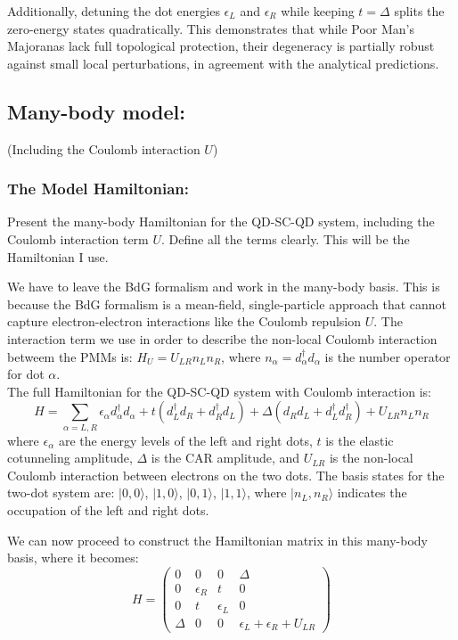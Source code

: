 \documentclass[11pt, letterpaper, titlepage]{article}
\begin{document}
Additionally, detuning the dot energies $\epsilon_L$ and $\epsilon_R$ while keeping $t = \Delta$ splits the zero-energy states quadratically. This demonstrates that while Poor Man’s Majoranas lack full topological protection, their degeneracy is partially robust against small local perturbations, in agreement with the analytical predictions.
\newpage
\subsection{Many-body model:} (Including the Coulomb interaction $U$)
\subsubsection{The Model Hamiltonian:} Present the many-body Hamiltonian for the QD-SC-QD system, including the Coulomb interaction term $U$. Define all the terms clearly. This will be the Hamiltonian I use.\par
We have to leave the BdG formalism and work in the many-body basis. This is because the BdG formalism is a mean-field, single-particle approach that cannot capture electron-electron interactions like the Coulomb repulsion $U$. The interaction term we use in order to describe the non-local Coulomb interaction betweem the PMMs is: $H_U=U_{LR}n_Ln_R$, where $n_{α}=d_{α}^{†}d_{α}$ is the number operator for dot $α$.\\
The full Hamiltonian for the QD-SC-QD system with Coulomb interaction is:
$$
H = ∑_{α=L,R} ϵ_{α} d_{α}^{†}d_{α} + t (d_L^{†} d_R + d_R^{†} d_L) + Δ (d_R d_L + d_L^{†} d_R^{†})  + U_{LR} n_L n_R
$$
where $ϵ_{α}$ are the energy levels of the left and right dots, $t$ is the elastic cotunneling amplitude, $Δ$ is the CAR amplitude, and $U_{LR}$ is the non-local Coulomb interaction between electrons on the two dots. The basis states for the two-dot system are: $|0,0⟩$, $|1,0⟩$, $|0,1⟩$, $|1,1⟩$, where $|n_L,n_R⟩$ indicates the occupation of the left and right dots.\par
We can now proceed to construct the Hamiltonian matrix in this many-body basis, where it becomes:
$$
H = \begin{pmatrix}
0 & 0 & 0 & Δ \\
0 & ϵ_R & t & 0 \\
0 & t & ϵ_L & 0 \\
Δ & 0 & 0 & ϵ_L + ϵ_R + U_{LR}
\end{pmatrix}
$$
\end{document}
